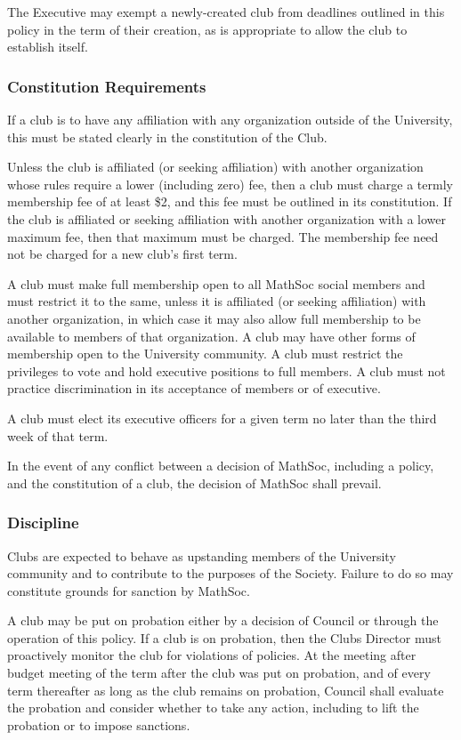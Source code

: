 The Executive may exempt a newly-created club from deadlines outlined in this
policy in the term of their creation, as is appropriate to allow the club to
establish itself.

\subsubsection{Constitution Requirements}
If a club is to have any affiliation with any organization outside of the
University, this must be stated clearly in the constitution of the Club.

Unless the club is affiliated (or seeking affiliation) with another organization
whose rules require a lower (including zero) fee, then a club must charge a
termly membership fee of at least \$2, and this fee must be outlined in its
constitution. If the club is affiliated or seeking affiliation with another
organization with a lower maximum fee, then that maximum must be charged. The
membership fee need not be charged for a new club's first term.

A club must make full membership open to all MathSoc social members and must
restrict it to the same, unless it is affiliated (or seeking affiliation) with
another organization, in which case it may also allow full membership to be
available to members of that organization. A club may have other forms of
membership open to the University community. A club must restrict the privileges
to vote and hold executive positions to full members. A club must not practice
discrimination in its acceptance of members or of executive.

A club must elect its executive officers for a given term no later than the
third week of that term.

In the event of any conflict between a decision of MathSoc, including a policy,
and the constitution of a club, the decision of MathSoc shall prevail.

\subsubsection{Discipline}
Clubs are expected to behave as upstanding members of the University community
and to contribute to the purposes of the Society. Failure to do so may
constitute grounds for sanction by MathSoc.

A club may be put on probation either by a decision of Council or through the
operation of this policy. If a club is on probation, then the Clubs Director
must proactively monitor the club for violations of policies. At the meeting
after budget meeting of the term after the club was put on probation, and of
every term thereafter as long as the club remains on probation, Council shall
evaluate the probation and consider whether to take any action, including to
lift the probation or to impose sanctions.

